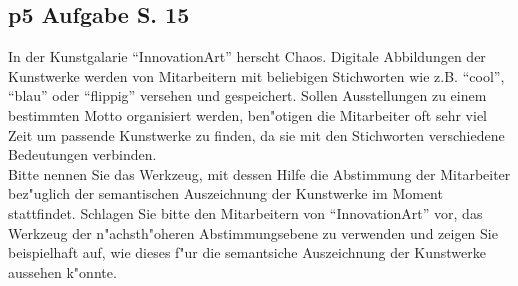\subsection{p5 Aufgabe S. 15}
In der Kunstgalarie "`InnovationArt"' herscht Chaos.
Digitale Abbildungen der Kunstwerke werden von Mitarbeitern mit beliebigen Stichworten wie z.B. "`cool"', "`blau"' oder "`flippig"' versehen und gespeichert.
Sollen Ausstellungen zu einem bestimmten Motto organisiert werden, ben"otigen die Mitarbeiter oft sehr viel Zeit um passende Kunstwerke zu finden, da sie mit den Stichworten verschiedene Bedeutungen verbinden.\\

\noindent
Bitte nennen Sie das Werkzeug, mit dessen Hilfe die Abstimmung der Mitarbeiter bez"uglich der semantischen Auszeichnung der Kunstwerke im Moment stattfindet.
Schlagen Sie bitte den Mitarbeitern von "`InnovationArt"' vor, das Werkzeug der n"achsth"oheren Abstimmungsebene zu verwenden und zeigen Sie beispielhaft auf, wie dieses f"ur die semantsiche Auszeichnung der Kunstwerke aussehen k"onnte.\\


